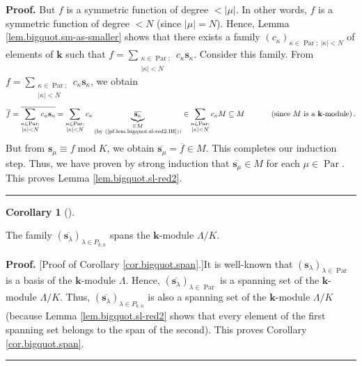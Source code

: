 \documentclass[numbers=enddot,12pt,final,onecolumn,notitlepage]{scrartcl}%
\theoremstyle{definition}
\newtheorem{coro}[theo]{Corollary}
\newenvironment{corollary}[1][]
{\begin{coro}[#1]\begin{leftbar}}
{\end{leftbar}\end{coro}}
\newenvironment{proof}[1][Proof]{\noindent\textbf{#1.} }{\ \rule{0.5em}{0.5em}}
\let\sumnonlimits\sum
\renewcommand{\sum}{\sumnonlimits\limits}
\begin{document}
\begin{proof}
But $f$ is a symmetric function of degree $<\left\vert \mu\right\vert $. In
other words, $f$ is a symmetric function of degree $<N$ (since $\left\vert
\mu\right\vert =N$). Hence, Lemma \ref{lem.bigquot.sm-as-smaller} shows that
there exists a family $\left(  c_{\kappa}\right)  _{\kappa\in
\operatorname*{Par};\ \left\vert \kappa\right\vert <N}$ of elements of
$\mathbf{k}$ such that $f=\sum_{\substack{\kappa\in\operatorname*{Par}%
;\\\left\vert \kappa\right\vert <N}}c_{\kappa}\mathbf{s}_{\kappa}$. Consider
this family. From $f=\sum_{\substack{\kappa\in\operatorname*{Par};\\\left\vert
\kappa\right\vert <N}}c_{\kappa}\mathbf{s}_{\kappa}$, we obtain%
\[
\overline{f}=\overline{\sum_{\substack{\kappa\in\operatorname*{Par}%
;\\\left\vert \kappa\right\vert <N}}c_{\kappa}\mathbf{s}_{\kappa}}%
=\sum_{\substack{\kappa\in\operatorname*{Par};\\\left\vert \kappa\right\vert
<N}}c_{\kappa}\underbrace{\overline{\mathbf{s}_{\kappa}}}_{\substack{\in
M\\\text{(by (\ref{pf.lem.bigquot.sl-red2.IH}))}}}\in\sum_{\substack{\kappa
\in\operatorname*{Par};\\\left\vert \kappa\right\vert <N}}c_{\kappa}M\subseteq
M\ \ \ \ \ \ \ \ \ \ \left(  \text{since }M\text{ is a }\mathbf{k}%
\text{-module}\right)  .
\]
But from $\mathbf{s}_{\mu}\equiv f\operatorname{mod}K$, we obtain
$\overline{\mathbf{s}_{\mu}}=\overline{f}\in M$. This completes our induction
step. Thus, we have proven by strong induction that $\overline{\mathbf{s}%
_{\mu}}\in M$ for each $\mu\in\operatorname*{Par}$. This proves Lemma
\ref{lem.bigquot.sl-red2}.
\end{proof}

\begin{corollary}
\label{cor.bigquot.span}The family $\left(  \overline{\mathbf{s}_{\lambda}%
}\right)  _{\lambda\in P_{k,n}}$ spans the $\mathbf{k}$-module $\Lambda/K$.
\end{corollary}

\begin{proof}
[Proof of Corollary \ref{cor.bigquot.span}.]It is well-known that $\left(
\mathbf{s}_{\lambda}\right)  _{\lambda\in\operatorname*{Par}}$ is a basis of
the $\mathbf{k}$-module $\Lambda$. Hence, $\left(  \overline{\mathbf{s}%
_{\lambda}}\right)  _{\lambda\in\operatorname*{Par}}$ is a spanning set of the
$\mathbf{k}$-module $\Lambda/K$. Thus, $\left(  \overline{\mathbf{s}_{\lambda
}}\right)  _{\lambda\in P_{k,n}}$ is also a spanning set of the $\mathbf{k}%
$-module $\Lambda/K$ (because Lemma \ref{lem.bigquot.sl-red2} shows that every
element of the first spanning set belongs to the span of the second). This
proves Corollary \ref{cor.bigquot.span}.
\end{proof}
\end{document}
